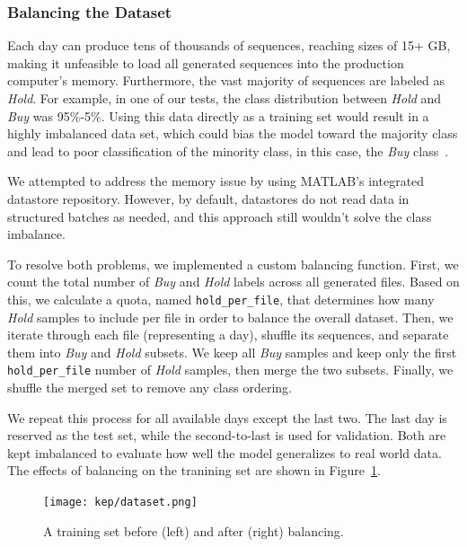 \documentclass[a4paper,oneside,onecolumn,12pt]{book}
\begin{document}
		\subsubsection{Balancing the Dataset}
		Each day can produce tens of thousands of sequences, reaching sizes of 15+ GB, making it unfeasible to load all generated sequences into the production computer's memory. Furthermore, the vast majority of sequences are labeled as \textit{Hold}. For example, in one of our tests, the class distribution between \textit{Hold} and \textit{Buy} was 95\%-5\%. Using this data directly as a training set would result in a highly imbalanced data set, which could bias the model toward the majority class and lead to poor classification of the minority class, in this case, the \textit{Buy} class~\cite{DID}.

		We attempted to address the memory issue by using MATLAB's integrated datastore repository. However, by default, datastores do not read data in structured batches as needed, and this approach still wouldn't solve the class imbalance.

		To resolve both problems, we implemented a custom balancing function. First, we count the total number of \textit{Buy} and \textit{Hold} labels across all generated files. Based on this, we calculate a quota, named \texttt{hold\_per\_file}, that determines how many \textit{Hold} samples to include per file in order to balance the overall dataset. Then, we iterate through each file (representing a day), shuffle its sequences, and separate them into \textit{Buy} and \textit{Hold} subsets. We keep all \textit{Buy} samples and keep only the first \texttt{hold\_per\_file} number of \textit{Hold} samples, then merge the two subsets. Finally, we shuffle the merged set to remove any class ordering.

		We repeat this process for all available days except the last two. The last day is reserved as the test set, while the second-to-last is used for validation. Both are kept imbalanced to evaluate how well the model generalizes to real world data. The effects of balancing on the tranining set are shown in Figure~\ref{fig:un_balanced_dataset}.

		\begin{figure}[H]
		\begin{center}
			\texttt{[image: kep/dataset.png]}
			\caption{A training set before (left) and after (right) balancing.}
			\label{fig:un_balanced_dataset}
		\end{center}
		\end{figure}
\end{document}
